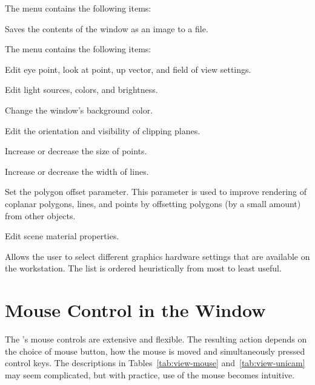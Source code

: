 \begin{description}
   The  menu contains the following items:

  \begin{description}
     Saves the
    contents of the \viewer{} window as an image to a file.
  \end{description}
  
   The  menu contains the following items:
  \begin{description}
     Edit eye point, look
    at point, up vector, and field of view settings.

     Edit light sources,
    colors, and brightness.

     Change the \viewer{}
    window's background color.

     Edit the orientation and visibility
    of clipping planes.

     Increase or decrease the size of points.

     Increase or decrease the width of lines.
    
     Set the polygon offset parameter.
    This parameter is used to improve rendering of coplanar
    polygons, lines, and points by offsetting polygons (by a small
    amount) from other objects.

     Edit scene material properties.
  \end{description}

   Allows the user to select different
  graphics hardware settings that are available on the workstation.
  The list is ordered heuristically from most to least useful.
\end{description}

\section{Mouse Control in the \viewer{} Window}
\label{sec:view-mouse} 

The \viewer{}'s mouse controls are extensive and flexible.  The
resulting action depends on the choice of mouse button, how the mouse
is moved and simultaneously pressed control keys.  The descriptions in
Tables~\ref{tab:view-mouse} and~\ref{tab:view-unicam} may seem
complicated, but with practice, use of the mouse becomes intuitive.


